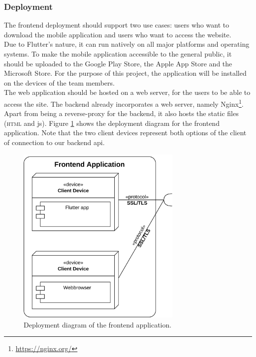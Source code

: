 \subsubsection{Deployment}
The frontend deployment should support two use cases: users who want to download the mobile application and users who want to access the website. \\

Due to Flutter's nature, it can run natively on all major platforms and operating systems. To make the mobile application accessible to the general public, it should be uploaded to the Google Play Store, the Apple App Store and the Microsoft Store. For the purpose of this project, the application will be installed on the devices of the team members. \\

The web application should be hosted on a web server, for the users to be able to access the site. The backend already incorporates a web server, namely Nginx\footnote{\url{https://nginx.org/}}. Apart from being a reverse-proxy for the backend, it also hosts the static files (\textsc{html} and \ac{js}). Figure \ref{fig:deployment-frontend} shows the deployment diagram for the frontend application. Note that the two client devices represent both options of the client of connection to our backend \ac{api}.


\begin{figure}[H]
    \centering
    \includegraphics[width=8cm]{images/deployment_diagram_frontend.drawio.png}
    \caption{Deployment diagram of the frontend application.}
    \label{fig:deployment-frontend}
\end{figure}

